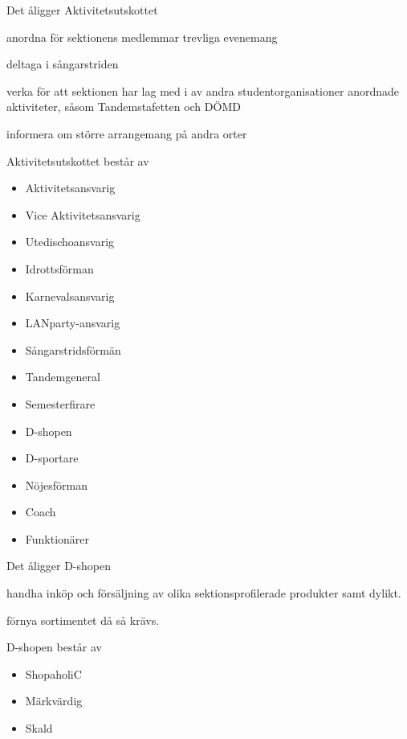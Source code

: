 \documentclass[pdfbookmarks,a4paper,11pt]{article}
\newlength{\itemcollength}
\newenvironment{reglemlista}{%
  \begin{list}{}{%
      \setlength{\labelwidth}{\itemcollength}%
      \setlength{\leftmargin}{\labelwidth + \labelsep}%
      \renewcommand{\makelabel}[1]{%
        \raisebox{0pt}[1ex][0pt]{%
          \makebox[\labelwidth][l]{%
            \parbox[t]{\itemcollength}{%
              \raggedright\hspace{0pt}##1}}}\hfill}%
      }}{%
  \end{list}}
\begin{document}
\begin{reglemlista}

	\item[Åligganden]
	Det åligger Aktivitetsutskottet
	\begin{attlista}
		\item anordna för sektionens medlemmar trevliga evenemang
		\item deltaga i sångarstriden
		\item verka för att sektionen har lag med i av andra studentorganisationer anordnade aktiviteter, såsom Tandemstafetten och DÖMD
		\item informera om större arrangemang på andra orter
	\end{attlista}

	\item[Sammansättning]
	Aktivitetsutskottet består av
	\begin{itemize}
		\item Aktivitetsansvarig
		\item Vice Aktivitetsansvarig
		\item Utedischoansvarig
		\item Idrottsförman
		\item Karnevalsansvarig
		\item LANparty-ansvarig
		\item Sångarstridsförmän
		\item Tandemgeneral
		\item Semesterfirare
		\item D-shopen
		\item D-sportare
		\item Nöjesförman
		\item Coach
		\item Funktionärer
	\end{itemize}


	\item[\textbf{D-shopen}]

	\item[Åligganden]
	Det åligger D-shopen
	\begin{attlista}
		\item handha inköp och försäljning av olika sektionsprofilerade produkter samt dylikt.
		\item förnya sortimentet då så krävs.
	\end{attlista}
	\item[Sammansättning]
	D-shopen består av
	\begin{itemize}
		\item ShopaholiC
		\item Märkvärdig
		\item Skald
	\end{itemize}
\end{reglemlista}
\end{document}
